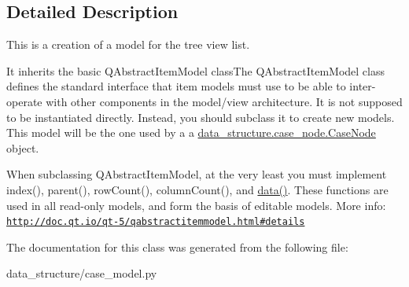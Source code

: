 \subsection{Detailed Description}
This is a creation of a model for the tree view list. 

It inherits the basic Q\+Abstract\+Item\+Model class\+The Q\+Abstract\+Item\+Model class defines the standard interface that item models must use to be able to inter-\/operate with other components in the model/view architecture. It is not supposed to be instantiated directly. Instead, you should subclass it to create new models. This model will be the one used by a a \hyperlink{a00089}{data\+\_\+structure.\+case\+\_\+node.\+Case\+Node} object.

When subclassing Q\+Abstract\+Item\+Model, at the very least you must implement index(), parent(), row\+Count(), column\+Count(), and \hyperlink{a00085_a2f7291849d0efb3d7cff499d1cde0bf6}{data()}. These functions are used in all read-\/only models, and form the basis of editable models. More info\+: \href{http://doc.qt.io/qt-5/qabstractitemmodel.html#details}{\tt http\+://doc.\+qt.\+io/qt-\/5/qabstractitemmodel.\+html\#details} 

The documentation for this class was generated from the following file\+:\begin{DoxyCompactItemize}
\item 
data\+\_\+structure/case\+\_\+model.\+py\end{DoxyCompactItemize}
